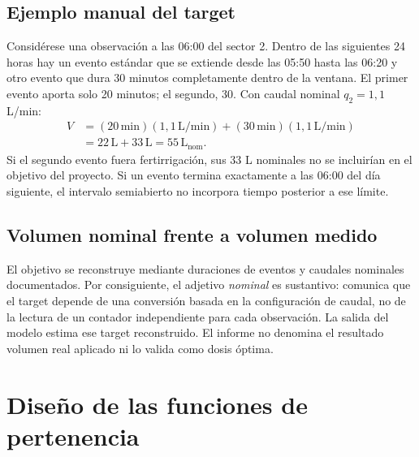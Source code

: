 \documentclass[11pt,letterpaper]{article}
\begin{document}
\subsection{Ejemplo manual del target}
Considérese una observación a las 06:00 del sector 2. Dentro de las siguientes 24 horas hay un evento estándar que se extiende desde las 05:50 hasta las 06:20 y otro evento que dura 30 minutos completamente dentro de la ventana. El primer evento aporta solo 20 minutos; el segundo, 30. Con caudal nominal $q_2=1{,}1$ L/min:
\begin{align*}
  V &= (20\,\mathrm{min})(1{,}1\,\mathrm{L/min})+(30\,\mathrm{min})(1{,}1\,\mathrm{L/min})\\
    &=22\,\mathrm{L}+33\,\mathrm{L}=55\,\mathrm{L}_{\mathrm{nom}}.
\end{align*}
Si el segundo evento fuera fertirrigación, sus 33 L nominales no se incluirían en el objetivo del proyecto. Si un evento termina exactamente a las 06:00 del día siguiente, el intervalo semiabierto no incorpora tiempo posterior a ese límite.

\subsection{Volumen nominal frente a volumen medido}
El objetivo se reconstruye mediante duraciones de eventos y caudales nominales documentados. Por consiguiente, el adjetivo \emph{nominal} es sustantivo: comunica que el target depende de una conversión basada en la configuración de caudal, no de la lectura de un contador independiente para cada observación. La salida del modelo estima ese target reconstruido. El informe no denomina el resultado volumen real aplicado ni lo valida como dosis óptima.

\section{Diseño de las funciones de pertenencia}
\end{document}
